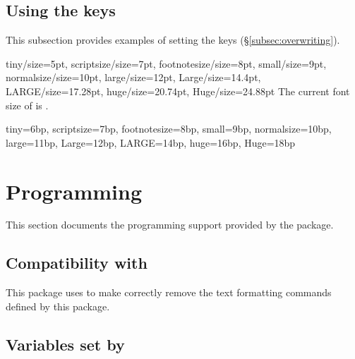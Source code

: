 \documentclass{beerydoc}
\begin{document}
\subsection
  {%
    Using the keys
    \texorpdfstring
      {}
      {/size}%
  }
\label{subsec:exnamesize}

This subsection provides examples of setting the keys
 (\S\ref{subsec:overwriting}).

\begin{codedemo}
  \begingroup
    \fontscalesetup
      {
        tiny/size=5pt,
        scriptsize/size=7pt,
        footnotesize/size=8pt,
        small/size=9pt,
        normalsize/size=10pt,
        large/size=12pt,
        Large/size=14.4pt,
        LARGE/size=17.28pt,
        huge/size=20.74pt,
        Huge/size=24.88pt
      }%
    \printsampletext
      {%
        The current font size of \printfontsizecommand{} is
        \the\currentfontsize.
      }
  \endgroup
\end{codedemo}
\clearpage

\begin{codedemo}
  \begingroup
    \fontscalesetup
      {
        tiny=6bp,
        scriptsize=7bp,
        footnotesize=8bp,
        small=9bp,
        normalsize=10bp,
        large=11bp,
        Large=12bp,
        LARGE=14bp,
        huge=16bp,
        Huge=18bp
      }%
  \endgroup
\end{codedemo}
\clearpage


\section{Programming}
\label{sec:expl3}

This section documents the  programming support provided by the
 package.

\subsection{Compatibility with }
\label{subsec:textpurify}

This package uses  to make
 correctly remove the text formatting commands defined by
this package.

\subsection{Variables set by }
\label{subsec:varsetup}
\end{document}
